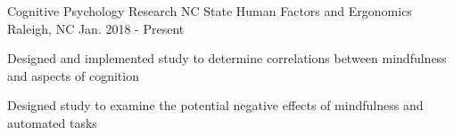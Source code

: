 

\begin{cventries}

  \cventry
    {Cognitive Psychology Research} %
    {NC State Human Factors and Ergonomics} %
    {Raleigh, NC} %
    {Jan. 2018 - Present} %
    {
      \begin{cvitems} %
        \item {Designed and implemented study to determine correlations between mindfulness and aspects of cognition}
        \item {Designed study to examine the potential negative effects of mindfulness and automated tasks}
      \end{cvitems}
    }

\end{cventries}
